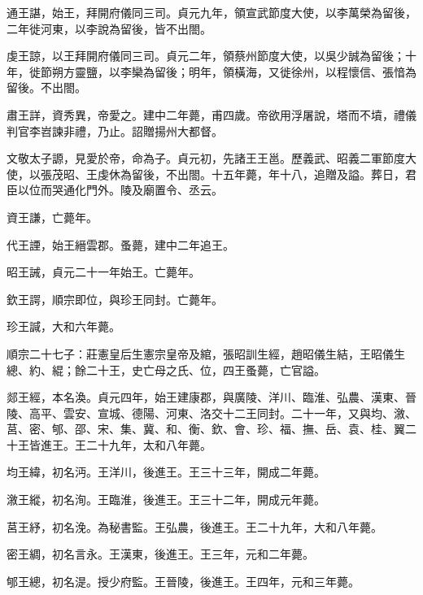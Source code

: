 \begin{pinyinscope}
 通王諶，始王，拜開府儀同三司。貞元九年，領宣武節度大使，以李萬榮為留後，二年徙河東，以李說為留後，皆不出閤。



 虔王諒，以王拜開府儀同三司。貞元二年，領蔡州節度大使，以吳少誠為留後；十年，徙節朔方靈鹽，以李欒為留後；明年，領橫海，又徙徐州，以程懷信、張愔為留後。不出閤。



 肅王詳，資秀異，帝愛之。建中二年薨，甫四歲。帝欲用浮屠說，塔而不墳，禮儀判官李岧諫非禮，乃止。詔贈揚州大都督。



 文敬太子謜，見愛於帝，命為子。貞元初，先諸王王邕。歷義武、昭義二軍節度大使，以張茂昭、王虔休為留後，不出閤。十五年薨，年十八，追贈及謚。葬日，君臣以位而哭通化門外。陵及廟置令、丞云。



 資王謙，亡薨年。



 代王諲，始王縉雲郡。蚤薨，建中二年追王。



 昭王誡，貞元二十一年始王。亡薨年。



 欽王諤，順宗即位，與珍王同封。亡薨年。



 珍王諴，大和六年薨。



 順宗二十七子：莊憲皇后生憲宗皇帝及綰，張昭訓生經，趙昭儀生結，王昭儀生總、約、緄；餘二十王，史亡母之氏、位，四王蚤薨，亡官謚。



 郯王經，本名渙。貞元四年，始王建康郡，與廣陵、洋川、臨淮、弘農、漢東、晉陵、高平、雲安、宣城、德陽、河東、洛交十二王同封。二十一年，又與均、漵、莒、密、郇、邵、宋、集、冀、和、衡、欽、會、珍、福、撫、岳、袁、桂、翼二十王皆進王。王二十九年，太和八年薨。



 均王緯，初名沔。王洋川，後進王。王三十三年，開成二年薨。



 漵王縱，初名洵。王臨淮，後進王。王三十二年，開成元年薨。



 莒王紓，初名浼。為秘書監。王弘農，後進王。王二十九年，大和八年薨。



 密王綢，初名言永。王漢東，後進王。王三年，元和二年薨。



 郇王總，初名湜。授少府監。王晉陵，後進王。王四年，元和三年薨。




\end{pinyinscope}
